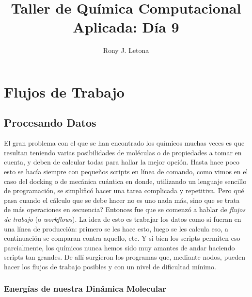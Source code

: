 \documentclass[10pt,letterpaper]{article}
\author{Rony J. Letona}
\title{Taller de Qu\'imica Computacional Aplicada: D\'ia 9}
\begin{document}
\maketitle

\section{Flujos de Trabajo}


\subsection{Procesando Datos}
El gran problema con el que se han encontrado los qu\'imicos muchas veces es que resultan teniendo varias posibilidades de mol\'eculas o de propiedades a tomar en cuenta, y deben de calcular todas para hallar la mejor opci\'on. Hasta hace poco esto se hac\'ia siempre con peque\~nos scripts en l\'inea de comando, como vimos en el caso del docking o de mec\'anica cu\'antica en donde, utilizando un lenguaje sencillo de programaci\'on, se simplific\'o hacer una tarea complicada y repetitiva. Pero qu\'e pasa cuando el c\'alculo que se debe hacer no es uno nada m\'as, sino que se trata de m\'as operaciones en secuencia? Entonces fue que se comenz\'o a hablar de \emph{flujos de trabajo} (o \emph{workflows}). La idea de esto es trabajar los datos como si fueran en una l\'inea de producci\'on: primero se les hace esto, luego se les calcula eso, a continuaci\'on se comparan contra aquello, etc. Y si bien los scripts permiten eso parcialmente, los qu\'imicos nunca hemos sido muy amantes de andar haciendo scripts tan grandes. De all\'i surgieron los programas que, mediante nodos, pueden hacer los flujos de trabajo posibles y con un nivel de dificultad m\'inimo.\\

\subsubsection{Energ\'ias de nuestra Din\'amica Molecular}
\end{document}
